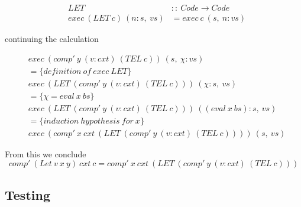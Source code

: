 \documentclass {article}
\begin{document}
\begin{eqnarray*}
 	&LET\ &::\ Code \rightarrow Code \\
 	&exec\ (LET\ c)\ (n:s,\ vs) &= exec\ c\ (s,\ n:vs)
\end{eqnarray*}

continuing the calculation

\begin{align*}
&exec\ (comp'\ y\ (v:cxt)\ (TEL\ c))\ (s,\ \chi : vs) \\
&= \{definition\ of\ exec\ LET\} \\
&exec\ (LET\ (comp'\ y\ (v:cxt)\ (TEL\ c)))\ (\chi : s,\ vs)\\
&= \{ \chi = eval\ x\ bs \} \\
&exec\ (LET\ (comp'\ y\ (v:cxt)\ (TEL\ c)))\ ((eval\ x\ bs) : s,\ vs)\\
&= \{ induction\ hypothesis\ for\ x \} \\
&exec\ (comp'\ x\ cxt\ (LET\ (comp'\ y\ (v:cxt)\ (TEL\ c))))\ (s,\ vs)
\end{align*}

From this we conclude
\[ comp'\ (Let\ v\ x\ y)\ cxt\ c
		= comp'\ x\ cxt\ (LET\ (comp'\ y\ (v:cxt)\ (TEL\ c))) \]

\subsection{Testing}












\end{document}
